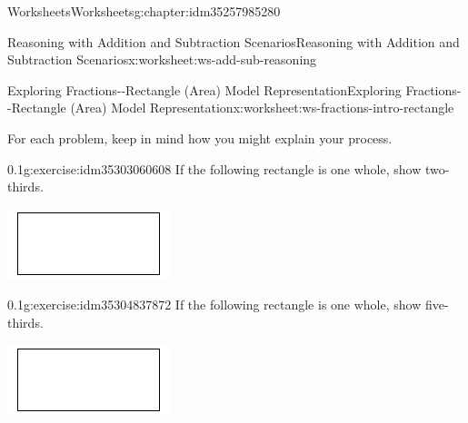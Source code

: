 \documentclass[twoside,11pt,]{book}
\begin{document}
\begin{chapterptx}{Worksheets}{}{Worksheets}{}{}{g:chapter:idm35257985280}
\begin{worksheet-section-numberless}{Reasoning with Addition and Subtraction Scenarios}{}{Reasoning with Addition and Subtraction Scenarios}{}{}{x:worksheet:ws-add-sub-reasoning}
\end{worksheet-section-numberless}
\restoregeometry
%
%
\typeout{************************************************}
\typeout{************************************************}
%
\begin{worksheet-section-numberless}{Exploring Fractions-{}-{}Rectangle (Area) Model Representation}{}{Exploring Fractions-{}-{}Rectangle (Area) Model Representation}{}{}{x:worksheet:ws-fractions-intro-rectangle}
\begin{introduction}{}%
For each problem, keep in mind how you might explain your process.%
\end{introduction}%
\begin{divisionexercise}{1}{}{0.1}{g:exercise:idm35303060608}%
If the following rectangle is one whole, show two-thirds. \begin{sidebyside}{1}{0.3}{0.3}{0}%
\begin{sbspanel}{0.4}%
\includegraphics[width=1\linewidth]{images/generic-rectangle.png}
\end{sbspanel}%
\end{sidebyside}%
%
\end{divisionexercise}%
\begin{divisionexercise}{2}{}{0.1}{g:exercise:idm35304837872}%
If the following rectangle is one whole, show five-thirds. \begin{sidebyside}{1}{0.3}{0.3}{0}%
\begin{sbspanel}{0.4}%
\includegraphics[width=1\linewidth]{images/generic-rectangle.png}

\end{sbspanel}
\end{sidebyside}
\end{divisionexercise}
\end{worksheet-section-numberless}
\end{chapterptx}
\end{document}
